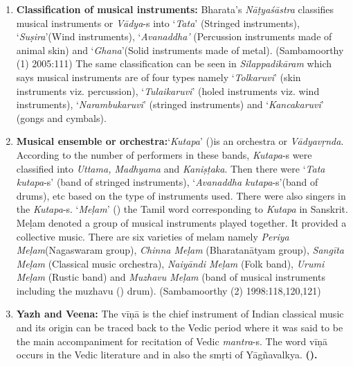 \begin{enumerate}[{\rm 1.}]
\itemsep=0pt
\item \textbf{Classification of musical instruments:} Bharata’s \textit{Nāṭyaśāstra} classifies musical instruments or \textit{Vādya}-s into ‘\textit{Tata}’ (Stringed instruments), ‘\textit{Suṣira}’(Wind instruments), ‘\textit{Avanaddha’ }(Percussion instruments made of animal skin) and ‘\textit{Ghana}’(Solid instruments made of metal). (Sambamoorthy (1) 2005:111) The same classification can be seen in \textit{Silappadikāram} which says musical instruments are of four types namely ‘\textit{Tolkaruvi}’ (skin instruments viz. percussion), ‘\textit{Tulaikaruvi}’ (holed instruments viz. wind instruments), ‘\textit{Narambu\-karuvi}’ (stringed instruments) and ‘\textit{Kancakaruvi}’ (gongs and cymbals).

 \item \textbf{Musical ensemble or orchestra:}‘\textit{Kutapa}’ ()is an orchestra or \textit{Vādyavṛnda}. According to the number of performers in these bands, \textit{Kutapa}-s were classified into \textit{Uttama, Madhyama} and \textit{Kaniṣṭaka}. Then there were ‘\textit{Tata kutapa}-s’ (band of stringed instruments), ‘\textit{Avanaddha kutapa}-s’(band of drums), etc based on the type of instruments used. There were also singers in the \textit{Kutapa}-s. ‘\textit{Meḷam}’ () the Tamil word corresponding to \textit{Kutapa} in Sanskrit. Meḷam denoted a group of musical instruments played together. It provided a collective music. There are six varieties of melam namely \textit{Periya Meḷam}(Nagaswaram group), \textit{Chinna Meḷam} (Bharatanātyam group), \textit{Sangīta Meḷam} (Classical music orchestra), \textit{Naiyāndi Meḷam} (Folk band), \textit{Urumi Meḷam} (Rustic band) and \textit{Muzhavu Meḷam} (band of musical instruments including the muzhavu () drum). (Sambamoorthy (2) 1998:118,120,121)

 \item \textbf{Yazh and Veena:} The vīṇā is the chief instrument of Indian classical music and its origin can be traced back to the Vedic period where it was said to be the main accompaniment for recitation of Vedic \textit{mantra}-s. The word vīṇā occurs in the Vedic literature and in also the smṛti of Yāgñavalkya. \textbf{().}

\end{enumerate}

